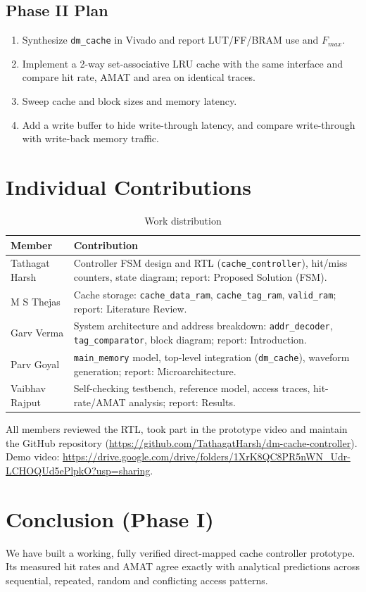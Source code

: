 \documentclass[conference]{IEEEtran}
\newcommand{\MemA}{Tathagat Harsh}  \newcommand{\RollA}{2401010477}
\newcommand{\MemB}{M S Thejas}  \newcommand{\RollB}{2401010255}
\newcommand{\MemC}{Garv Verma}  \newcommand{\RollC}{2401010168}
\newcommand{\MemD}{Parv Goyal}  \newcommand{\RollD}{2401010322}
\newcommand{\MemE}{Vaibhav Rajput}  \newcommand{\RollE}{2401010487}
\newcommand{\RepoURL}{https://github.com/TathagatHarsh/dm-cache-controller}
\newcommand{\VideoURL}{https://drive.google.com/drive/folders/1XrK8QC8PR5nWN_Udr-LCHOQUd5ePlpkO?usp=sharing}
\begin{document}
\subsection{Phase II Plan}
\begin{enumerate}
\item Synthesize \texttt{dm\_cache} in Vivado and report LUT/FF/BRAM use and $F_{max}$.
\item Implement a 2-way set-associative LRU cache with the same interface and compare hit rate, AMAT and area on identical traces.
\item Sweep cache and block sizes and memory latency.
\item Add a write buffer to hide write-through latency, and compare write-through with write-back memory traffic.
\end{enumerate}

\section{Individual Contributions}
\begin{table}[h]
\centering
\caption{Work distribution}
\label{tab:contrib}
\begin{tabular}{@{}>{\raggedright\arraybackslash}p{}>{\raggedright\arraybackslash}p{}@{}}
\toprule
Member & Contribution \\ \midrule
\MemA & Controller FSM design and RTL (\texttt{cache\_controller}), hit/miss counters, state diagram; report: Proposed Solution (FSM). \\
\MemB & Cache storage: \texttt{cache\_data\_ram}, \texttt{cache\_tag\_ram}, \texttt{valid\_ram}; report: Literature Review. \\
\MemC & System architecture and address breakdown: \texttt{addr\_decoder}, \texttt{tag\_comparator}, block diagram; report: Introduction. \\
\MemD & \texttt{main\_memory} model, top-level integration (\texttt{dm\_cache}), waveform generation; report: Microarchitecture. \\
\MemE & Self-checking testbench, reference model, access traces, hit-rate/AMAT analysis; report: Results. \\ \bottomrule
\end{tabular}
\end{table}
All members reviewed the RTL, took part in the prototype video and maintain the GitHub repository (\url{\RepoURL}). Demo video: \url{\VideoURL}.

\section*{Conclusion (Phase I)}
We have built a working, fully verified direct-mapped cache controller prototype. Its measured hit rates and AMAT agree exactly with analytical predictions across sequential, repeated, random and conflicting access patterns.
\end{document}
